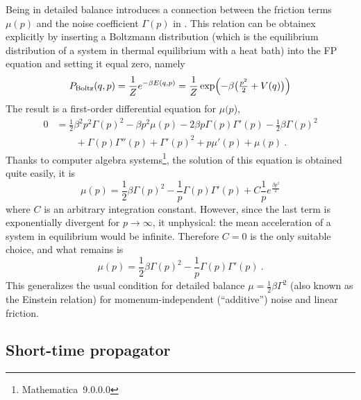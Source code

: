 Being in detailed balance introduces a connection between the friction terms \(\mu(p)\) and the noise coefficient \(\Gamma(p)\) in . This relation can be obtainex explicitly by inserting a Boltzmann distribution (which is the equilibrium distribution of a system in thermal equilibrium with a heat bath) into the FP equation  and setting it equal zero, namely
%
\begin{equation}
	P_\text{Boltz}(q,p)
	= \frac1Ze^{-\beta E(q,p)}
	= \frac1Z\exp\Bigl(-\beta \bigl(\tfrac{p^2}2+V(q)\bigr)\Bigr)
\end{equation}
%
The result is a first-order differential equation for \(\mu(p\)),
%
\begin{equation}\begin{split}
	0
	&=
	\frac12 \beta^2 p^2 \Gamma(p)^2
	- \beta p^2 \mu(p)
	- 2 \beta p \Gamma(p) \Gamma'(p)
	- \frac12 \beta  \Gamma(p)^2
	\\&\qquad
	+\Gamma(p) \Gamma''(p)
	+ \Gamma'(p)^2
	+ p \mu'(p)
	+ \mu(p)  ~.
\end{split}\end{equation}
%
Thanks to computer algebra systems\footnote{Mathematica~9.0.0.0}, the solution of this equation is obtained quite easily, it is
%
\begin{equation}
	\mu(p) = \frac12\beta\Gamma(p)^2 - \frac1p\Gamma(p)\Gamma'(p) + C\frac1pe^{\frac{\beta p^2}2}
\end{equation}
%
where \(C\) is an arbitrary integration constant. However, since the last term is exponentially divergent for \(p\to\infty\), it unphysical: the mean acceleration of a system in equilibrium would be infinite. Therefore \(C = 0\) is the only suitable choice, and what remains is
%
\begin{equation}
	\label{eqn:einstein}
	\mu(p) = \frac12\beta\Gamma(p)^2 - \frac1p\Gamma(p)\Gamma'(p) ~.
\end{equation}
%
This generalizes the usual condition for detailed balance \(\mu = \frac12\beta\Gamma^2\) (also known as the Einstein relation) for momenum-independent (``additive'') noise and linear friction.



\subsection{Short-time propagator}

